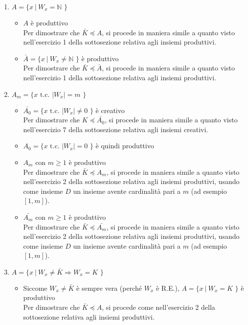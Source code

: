 \documentclass[a4paper,oneside,titlepage]{book}
\begin{document}
\begin{enumerate}[label=\fbox{\arabic*}]
\item $A = \text{\{ } x \ | \ W_x = \mathbb{N} \text{ \}}$
\begin{itemize}
\item $A$ è produttivo
\\ Per dimostrare che $\bar{K} \preceq A$, si procede in maniera simile a quanto visto nell'esercizio 1 della sottosezione relativa agli insiemi produttivi.

\item $\bar{A} = \text{\{ } x \ | \ W_x \neq \mathbb{N} \text{ \}}$ è produttivo
\\ Per dimostrare che $\bar{K} \preceq \bar{A}$, si procede in maniera simile a quanto visto nell'esercizio 1 della sottosezione relativa agli insiemi produttivi.
\end{itemize}

\item $A_m = \text{\{ } x \text{ t.c. } |W_x| = m \text{ \}}$
\begin{itemize}
\item $\bar{A_0} = \text{\{ } x \text{ t.c. } |W_x| \neq 0 \text{ \}}$ è creativo
\\ Per dimostrare che $K \preceq \bar{A_0}$, si procede in maniera simile a quanto visto nell'esercizio 7 della sottosezione relativa agli insiemi creativi.

\item $A_0 = \text{\{ } x \text{ t.c. } |W_x| = 0 \text{ \}}$ è quindi produttivo

\item $A_m$ con $m \geq 1$ è produttivo
\\ Per dimostrare che $\bar{K} \preceq A_m$, si procede in maniera simile a quanto visto nell'esercizio 2 della sottosezione relativa agli insiemi produttivi, usando come insieme $D$ un insieme avente cardinalità pari a $m$ (ad esempio $[1,m]$).

\item $\bar{A_m}$ con $m \geq 1$ è produttivo
\\ Per dimostrare che $\bar{K} \preceq \bar{A_m}$, si procede in maniera simile a quanto visto nell'esercizio 2 della sottosezione relativa agli insiemi produttivi, usando come insieme $D$ un insieme avente cardinalità pari a $m$ (ad esempio $[1,m]$).
\end{itemize}


\item $A = \text{\{ } x \ | \ W_x \neq \bar{K} \Rightarrow W_x = K \text{ \}}$
\begin{itemize}
\item Siccome $W_x \neq \bar{K}$ è sempre vera (perché $W_x$ è R.E.), $A = \text{\{ } x \ | \ W_x = K \text{ \}}$ è produttivo
\\ Per dimostrare che $\bar{K} \preceq A$, si procede come nell'esercizio 2 della sottosezione relativa agli insiemi produttivi.


\end{itemize}
\end{enumerate}
\end{document}
